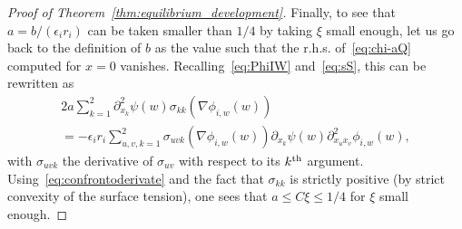\documentclass[10pt]{amsart}
\theoremstyle{definition}\newtheorem{defi}[theo]{Definition}\newtheorem{rema}[theo]{Remark}\newtheorem{exam}[theo]{Example}\newtheorem{exem}[theo]{Example}\newtheorem{nota}[theo]{Notation}
\begin{document}
\begin{proof}[Proof of Theorem~\ref{thm:equilibrium_development}]
Finally, to see that $a=b/(\epsilon_i r_i)$ can be taken smaller than $1/4$ by taking $\xi$ small enough, let us go back to the definition of $b$ as the value such that the r.h.s. of~\eqref{eq:chi-aQ} computed for $x=0$ vanishes. Recalling~\eqref{eq:PhiIW} and~\eqref{eq:sS}, this can be rewritten as
\begin{multline}\label{eq:ato0}
2a \sum_{k=1}^2 \partial^2_{x_k}\psi(w)\sigma_{kk}(\nabla \phi_{i,w}(w))\\= -\epsilon_i r_i \sum_{u,v,k=1}^2 \sigma_{uvk}(\nabla\phi_{i,w}(w))\partial_{x_k}\psi(w)\partial^2_{x_u x_v}\phi_{i,w}(w),
\end{multline}
with $\sigma_{uvk}$ the derivative of $\sigma_{uv}$ with respect to its $k^{\rm th}$ argument. Using~\eqref{eq:confrontoderivate} and the fact that $\sigma_{kk}$ is strictly positive (by strict convexity of the surface tension), one sees that $a\le C\xi\le 1/4$ for $\xi$ small enough.
\end{proof}

\vspace*{15pt}
\end{document}
